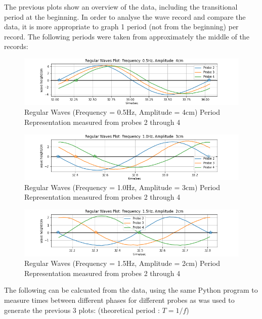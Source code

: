 \documentclass{article}
\begin{document}
	The previous plots show an overview of the data, including the transitional period at the beginning. In order to analyse the wave record and compare the data, it is more appropriate to graph 1 period (not from the beginning) per record. The following periods were taken from approximately the middle of the records:\\
	\begin{figure}[H]
		\centering
		\includegraphics[clip, trim = {1.5cm 0 1.5cm 0},width=\textwidth]{../graphs/F05A4Period.png}
		\caption{Regular Waves (Frequency = 0.5Hz, Amplitude = 4cm) Period Representation measured from probes 2 through 4}
		\label{f05a4period}
	\end{figure}
	\begin{figure}[H]
		\centering
		\includegraphics[clip, trim = {1.5cm 0 1.5cm 0}, width=\textwidth]{../graphs/F10A3Period.png}
		\caption{Regular Waves (Frequency = 1.0Hz, Amplitude = 3cm) Period Representation measured from probes 2 through 4}
		\label{f10a3period}
	\end{figure}
	\begin{figure}[H]
		\centering
		\includegraphics[clip, trim = {1.5cm 0 1.5cm 0},width=\textwidth]{../graphs/F15A2Period.png}
		\caption{Regular Waves (Frequency = 1.5Hz, Amplitude = 2cm) Period Representation measured from probes 2 through 4}
		\label{f15a2}
	\end{figure}
	The following can be calcuated from the data, using the same Python program to measure times between different phases for different probes as was used to generate the previous 3 plots: (theoretical period : $T = 1/f$)\\
\end{document}
